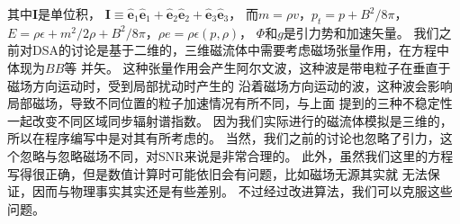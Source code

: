 其中$\mathbf{I}$是单位积，
$\mathbf{I} \equiv \hat{\boldsymbol{e}}_{1} \hat{\boldsymbol{e}}_{1}+
\hat{\boldsymbol{e}}_{2} \hat{\boldsymbol{e}}_{2}+\hat{\boldsymbol{e}}_{3}
\hat{\boldsymbol{e}}_{3}$， 而${m}=\rho {v}$，$p_{t}=p+B^{2} / 8\pi$，
$E=\rho \epsilon+m^{2}/2 \rho+B^{2}/8\pi$，$\rho e=\rho \epsilon(p, \rho)$，
$\Phi$和$g$是引力势和加速矢量。
我们之前对DSA的讨论是基于二维的，三维磁流体中需要考虑磁场张量作用，在方程中体现为$BB$等
并矢。
这种张量作用会产生阿尔文波，这种波是带电粒子在垂直于磁场方向运动时，受到局部扰动时产生的
沿着磁场方向运动的波，这种波会影响局部磁场，导致不同位置的粒子加速情况有所不同，与上面
提到的三种不稳定性一起改变不同区域同步辐射谱指数。
因为我们实际进行的磁流体模拟是三维的，所以在程序编写中是对其有所考虑的。
当然，我们之前的讨论也忽略了引力，这个忽略与忽略磁场不同，对SNR来说是非常合理的。
此外，虽然我们这里的方程写得很正确，但是数值计算时可能依旧会有问题，比如磁场无源其实就
无法保证，因而与物理事实其实还是有些差别。
不过经过改进算法，我们可以克服这些问题。
